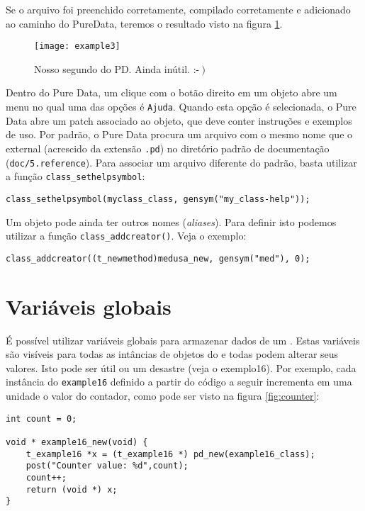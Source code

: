 Se o arquivo foi preenchido corretamente, compilado corretamente e adicionado
ao caminho do PureData, teremos o resultado visto na figura \ref{fig:exemplo3}.

\begin{figure}[h!]
	\centering
	\texttt{[image: example3]}
	\caption{Nosso segundo \external do PD. Ainda inútil. :-$\left.\right)$}
        \label{fig:exemplo3}
\end{figure}


Dentro do Pure Data, um clique com o botão direito em um objeto abre um menu
no qual uma das opções é \texttt{Ajuda}. Quando esta opção é selecionada, o
Pure Data abre um patch associado ao objeto, que deve conter instruções e
exemplos de uso. Por padrão, o Pure Data procura um arquivo com o mesmo nome
que o external (acrescido da extensão \texttt{.pd}) no diretório padrão de
documentação (\texttt{doc/5.reference}). Para associar um arquivo diferente do
padrão, basta utilizar a função \texttt{class\_sethelpsymbol}:

\vspace{1em}
\begin{lstlisting}
class_sethelpsymbol(myclass_class, gensym("my_class-help"));
\end{lstlisting}

Um objeto pode ainda ter outros nomes (\emph{aliases}). Para definir isto
podemos utilizar a função \texttt{class\_addcreator()}. Veja o exemplo:

\vspace{1em}
\begin{lstlisting}
class_addcreator((t_newmethod)medusa_new, gensym("med"), 0);
\end{lstlisting}

\section{Variáveis globais}

É possível utilizar variáveis globais para armazenar dados de um \external.
Estas variáveis são visíveis para todas as intâncias de objetos do \external e
todas podem alterar seus valores. Isto pode ser útil ou um desastre (veja o
exemplo16). Por exemplo, cada instância do \external \texttt{example16}
definido a partir do código a seguir incrementa em uma unidade o valor do
contador, como pode ser visto na figura \ref{fig:counter}:

\vspace{1em}
\begin{lstlisting}
int count = 0;

void * example16_new(void) {
    t_example16 *x = (t_example16 *) pd_new(example16_class);
    post("Counter value: %d",count);
    count++;
    return (void *) x;
}
\end{lstlisting}


